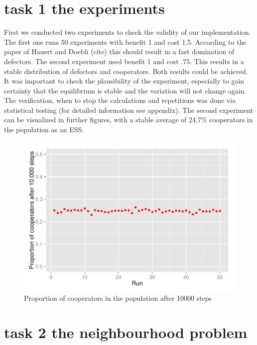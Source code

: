 \documentclass[DIV=calc, paper=a4, fontsize=11pt, twocolumn]{scrartcl}	 %
\begin{document}
\section*{task 1 the experiments}

First we conducted two experiments to check the validity of our implementation.
The first one runs 50 experiments with benefit 1 and cost 1.5. According to the paper of Hauert and Doebli (cite) this should result in a fast domination of defectors. The second experiment used benefit 1 and cost .75. This results in a stable distribution of defectors and cooperators. Both results could be achieved. It was important to check the plausibility of the experiment, especially to gain certainty that the equilibrium is stable and the variation will not change again. The verification, when to stop the calculations and repetitions was done via statistical testing (for detailed information see appendix).
The second experiment can be visualized in further figures, with a stable average of 24,7\% cooperators in the population as an ESS. 

\begin{figure}[here]
\centering
\begin{minipage}{.48\textwidth}
  \centering
  \includegraphics[width=1\linewidth]{task1prop}
 \caption{Proportion of cooperators in the population after 10000 steps}
\label{fig:PDspatialcluster}
\end{minipage}%
\end{figure}


\section*{task 2 the neighbourhood problem}
\end{document}
